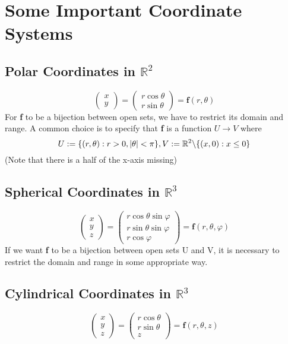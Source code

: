 \documentclass[11pt]{article}
\newcommand{\tb}[1]{\textbf{#1}}
\newcommand{\real}[0]{\mathbb{R}}
\begin{document}
\section{Some Important Coordinate Systems}
\subsection{Polar Coordinates in $\real^2$}
$$\begin{pmatrix}
    x\\y
\end{pmatrix}
= \begin{pmatrix}
    r\cos{\theta}\\
    r\sin{\theta}
\end{pmatrix}
= \tb{f}(r, \theta) $$
For \tb{f} to be a bijection between open sets, we have to restrict its domain and range. A common choice is to specify that \tb{f} is a function $U \rightarrow V$ where
$$U := \{(r, \theta): r > 0, |\theta| < \pi\},   V:= \real^2 \symbol{92}\{(x, 0): x \leq 0 \}$$
(Note that there is a half of the x-axis missing)
\subsection{Spherical Coordinates in $\real^3$}
$$\begin{pmatrix}
    x\\y\\z
\end{pmatrix}
= \begin{pmatrix}
    r\cos{\theta}\sin{\varphi}\\
    r\sin{\theta}\sin{\varphi}\\
    r\cos{\varphi}
\end{pmatrix}
= \tb{f}(r, \theta, \varphi)$$
If we want \tb{f} to be a bijection between open sets U and V, it is necessary to restrict the domain and range in some appropriate way.

\subsection{Cylindrical Coordinates in $\real^3$}
$$\begin{pmatrix}
    x\\y\\z
\end{pmatrix}
= \begin{pmatrix}
    r\cos{\theta}\\
    r\sin{\theta}\\
    z
\end{pmatrix}
= \tb{f}(r, \theta, z)$$
\end{document}
